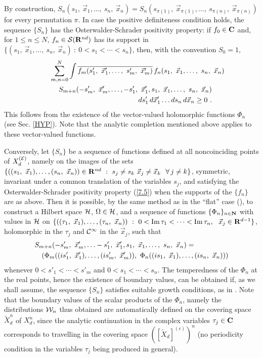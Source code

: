 \documentclass[a4paper,a4paper]{article}
\def\bC{{\bf C}}
\def\bR{{\bf R}}
\def\bN{{\bf N}}
\def\Im{{\rm Im\,}}
\def\CC{{\cal C}}
\def\EE{{\cal E}}
\def\HH{{\cal H}}
\def\SS{{\cal S}}
\def\WW{{\cal W}}
\def\wt{\widetilde}
\def\ovl{\overline}
\def\wXdn{{\wt X_d^n}}
\begin{document}
By construction,
$S_n(s_1,\ \vec{x}_1,\ldots,\ s_n,\ \vec{x}_n) =
S_n(s_{\pi(1)},\ \vec{x}_{\pi(1)},\ldots,\ s_{\pi(n)},\ \vec{x}_{\pi(n)})$
for every permutation $\pi$. In case the positive definiteness
condition holds, the sequence $\{S_n\}$ has the
Osterwalder-Schrader positivity property: if $f_0 \in \bC$ and,
for $1 \le n \le N$, $f_n \in \SS(\bR^{nd})$ has its support in
$\{(s_1,\ \vec{x}_1,\ldots,\ s_n,\ \vec{x}_n)\ :\ 0 < s_1 < \cdots < s_n\}$,
then, with the convention $S_0 = 1$,
\begin{eqnarray}
\lefteqn{
\sum_{m,n = 0}^N \int
\ovl{f_m(s'_1,\ \vec{x}'_1,\ldots,\ s'_m,\ \vec{x}'_m)}\,
f_n(s_1,\ \vec{x}_1,\ldots,\ s_n,\ \vec{x}_n)}\nonumber\\
&& S_{m+n}(-s'_m,\ \vec{x}'_m,\ldots, -s'_1,\ \vec{x}'_1,
s_1,\ \vec{x}_1,\ldots,\ s_n,\ \vec{x}_n)\nonumber\\
&&\hbox to 4cm {\hfill} ds'_1\,d\vec{x}'_1 \ldots ds_n\,d\vec{x}_n \ge 0\ .
\label{7.5}\end{eqnarray}
This follows from the existence of the vector-valued holomorphic
functions $\Phi_n$ (see Sec. \ref{HYP}). Note that the analytic completion
mentioned above applies to these vector-valued functions.

\vskip 0.2cm
Conversely, let $\{S_n\}$ be a sequence of functions defined
at all noncoinciding points of
$X_d^{(\EE)}$, namely on the images of the sets
$\{((s_1,\ \vec{x}_1),\ldots,
 (s_n,\ \vec{x}_n)) \in \bR^{nd}\ :\
s_j \not= s_k\
\vec x_j \not= \vec x_k\
\ \forall\,j\not= k\}$, symmetric, invariant under a
common translation of the variables $s_j$, and satisfying
the Osterwalder-Schrader positivity property (\ref{7.5}) when
the supports of the $\{f_n\}$ are as above. Then it is possible,
by the same method as in the ``flat'' case (\cite{OS1,OS2,G2}),
to construct a Hilbert space $\HH$, $\Omega \in \HH$, and a sequence of
functions $\{\Phi_n\}_{n \in \bN}$ with values in $\HH$ on
$\{((\tau_1,\ \vec{x}_1),\ldots,(\tau_n,\ \vec{x}_n))\ :\
0 < \Im \tau_1 < \cdots < \Im \tau_n,\ \  \vec{x}_j \in \bR^{d-1}\}$,
holomorphic in the $\tau_j$ and  $\CC^\infty$ in the $\vec{x}_j$,
such that
\begin{eqnarray}
\lefteqn{
S_{m+n}(-s'_m,\ \vec{x}'_m,\ldots -s'_1,\ \vec{x}'_1,
s_1,\ \vec{x}_1,\ldots,\ s_n,\ \vec{x}_n) = }\nonumber\\
&&(\Phi_m((is'_1,\ \vec{x}'_1),\ldots,(is'_m,\ \vec{x}'_m)),\
\Phi_n((is_1,\ \vec{x}_1),\ldots,(is_n,\ \vec{x}_n)))
\label{7.6}\end{eqnarray}
whenever $0 < s'_1 < \cdots < s'_m$ and
$0 < s_1 < \cdots < s_n$. The temperedness of the $\Phi_n$ at the
real points, hence the existence of boundary values,
can be obtained if, as we shall assume,
the sequence $\{S_n\}$ satisfies
suitable growth conditions, as in \cite{OS1,OS2,G2}.
Note that
the boundary values
of the scalar products of the $\Phi_n$, namely the distributions
$\WW_n$ thus obtained are automatically defined on the covering
space $\wXdn$ of $X_d^n$, since the analytic continuation
in the complex variables
$\tau_j \in {\bf C}$ corresponds to travelling in the covering space
$\left( [\wt X_d]^{(c)}\right)^n$ (no periodicity condition in the
variables $\tau_j$ being produced in general).
\end{document}
